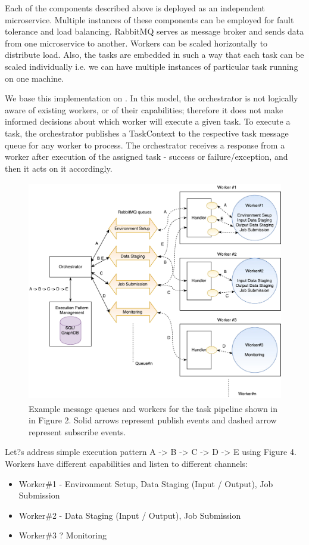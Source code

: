 \documentclass[review]{elsarticle}
\begin{document}
Each of the components described above is deployed as an independent microservice. Multiple instances of these components can be employed for fault tolerance and load balancing. RabbitMQ serves as message broker and sends data from one microservice to another.  Workers can be scaled horizontally to distribute load. Also, the tasks are embedded in such a way that each task can be scaled individually i.e. we can have multiple instances of particular task running on one machine. 

We base this implementation on \cite{sadooghi2014achieving}. In this model, the orchestrator is not logically aware of existing workers, or of their capabilities; therefore it does not make informed decisions about which worker will execute a given task.  To execute a task, the orchestrator publishes a TaskContext to the respective task message queue for any worker to process. The orchestrator receives a response from a worker after execution of the assigned task - success or failure/exception, and then it acts on it accordingly.  

\begin{figure}
\includegraphics[height=3.8in, width=4.8 in]{figures/figure4.pdf}
\caption{Example message queues and workers for the task pipeline shown in in Figure 2. Solid arrows represent publish events and dashed arrow represent subscribe events.}
\end{figure}

Let?s address simple execution pattern A -> B -> C -> D -> E using Figure 4.  Workers have different capabilities and listen to different channels:
\begin{itemize}
\item Worker\#1 - Environment Setup, Data Staging (Input / Output), Job Submission
\item Worker\#2 - Data Staging (Input / Output), Job Submission
\item Worker\#3 ? Monitoring
\end{itemize}
\end{document}
